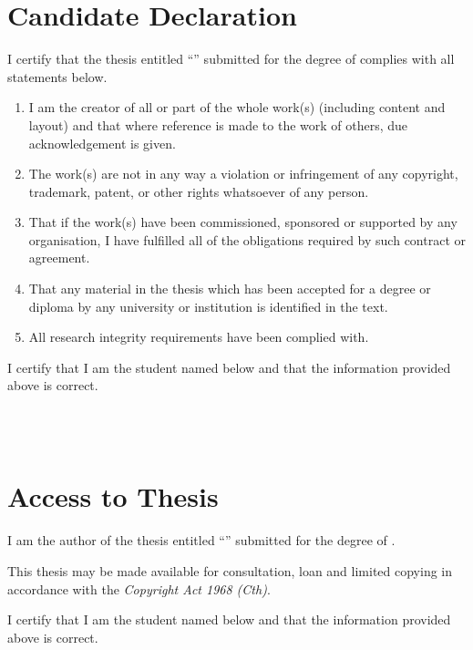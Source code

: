 \cleardoublepage
{}
{}
\chapter*{Candidate Declaration}
I certify that the thesis entitled ``\textit{\thetitle{}}'' submitted for the degree of \thedegree{} complies with all statements below.\bigskip
\begin{enumerate}[label=(\roman*)]
  \item I am the creator of all or part of the whole work(s) (including content and layout) and that where reference is made to the work of others, due acknowledgement is given.    
  \item The work(s) are not in any way a violation or infringement of any copyright, trademark, patent, or other rights whatsoever of any person.
  \item That if the work(s) have been commissioned, sponsored or supported by any organisation, I have fulfilled all of the obligations required by such contract or agreement.
  \item That any material in the thesis which has been accepted for a degree or diploma by any university or institution is identified in the text.
  \item All research integrity requirements have been complied with.
\end{enumerate}\bigskip
I certify that I am the student named below and that the information provided above is correct.

\vspace{2cm}
\noindent
\hspace{\fill}
\parbox[b]{0.4\linewidth}{
  \hrulefill\\
  \raggedleft
  \theauthor{}\\
  \footnotesize
  \thedate{}
}

\cleardoublepage
{}
{}
\chapter*{Access to Thesis}
I am the author of the thesis entitled ``\textit{\thetitle{}}'' submitted for the degree of \thedegree{}.
\bigskip

\noindent
This thesis may be made available for consultation, loan and limited copying in accordance with the \textit{Copyright Act 1968 (Cth)}.
\bigskip

\noindent
I certify that I am the student named below and that the information provided above is correct.

\vspace{2cm}
\noindent
\hspace{\fill}
\parbox[b]{0.4\linewidth}{
  \hrulefill\\
  \raggedleft
  \theauthor{}\\
  \footnotesize
  \thedate{}
}
\cleardoublepage